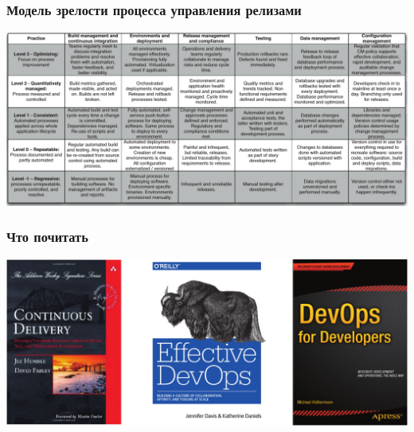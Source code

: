 \documentclass{../../slides-style}
\begin{document}
    \begin{frame}
        \frametitle{Модель зрелости процесса управления релизами}
        \begin{center}
            \includegraphics[width=\textwidth]{cdMaturityModel.png}
        \end{center}
    \end{frame}

    \begin{frame}
        \frametitle{Что почитать}
        \begin{center}
            \includegraphics[width=\textwidth]{books.png}
        \end{center}
    \end{frame}
\end{document}
